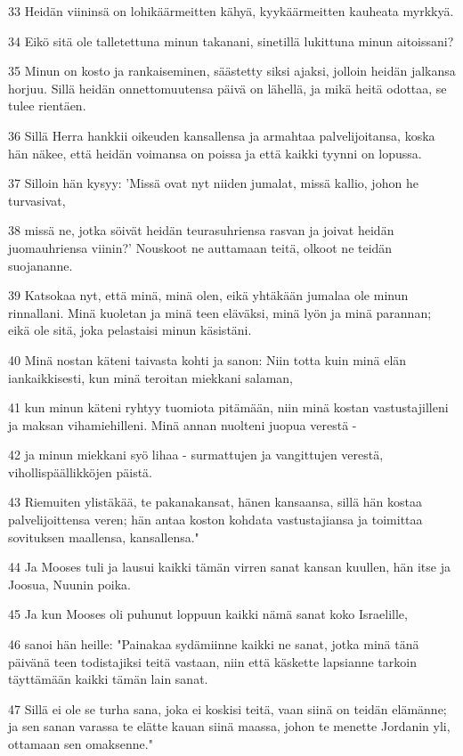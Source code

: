 \par 33 Heidän viininsä on lohikäärmeitten kähyä, kyykäärmeitten kauheata myrkkyä.
\par 34 Eikö sitä ole talletettuna minun takanani, sinetillä lukittuna minun aitoissani?
\par 35 Minun on kosto ja rankaiseminen, säästetty siksi ajaksi, jolloin heidän jalkansa horjuu. Sillä heidän onnettomuutensa päivä on lähellä, ja mikä heitä odottaa, se tulee rientäen.
\par 36 Sillä Herra hankkii oikeuden kansallensa ja armahtaa palvelijoitansa, koska hän näkee, että heidän voimansa on poissa ja että kaikki tyynni on lopussa.
\par 37 Silloin hän kysyy: 'Missä ovat nyt niiden jumalat, missä kallio, johon he turvasivat,
\par 38 missä ne, jotka söivät heidän teurasuhriensa rasvan ja joivat heidän juomauhriensa viinin?' Nouskoot ne auttamaan teitä, olkoot ne teidän suojananne.
\par 39 Katsokaa nyt, että minä, minä olen, eikä yhtäkään jumalaa ole minun rinnallani. Minä kuoletan ja minä teen eläväksi, minä lyön ja minä parannan; eikä ole sitä, joka pelastaisi minun käsistäni.
\par 40 Minä nostan käteni taivasta kohti ja sanon: Niin totta kuin minä elän iankaikkisesti, kun minä teroitan miekkani salaman,
\par 41 kun minun käteni ryhtyy tuomiota pitämään, niin minä kostan vastustajilleni ja maksan vihamiehilleni. Minä annan nuolteni juopua verestä -
\par 42 ja minun miekkani syö lihaa - surmattujen ja vangittujen verestä, vihollispäällikköjen päistä.
\par 43 Riemuiten ylistäkää, te pakanakansat, hänen kansaansa, sillä hän kostaa palvelijoittensa veren; hän antaa koston kohdata vastustajiansa ja toimittaa sovituksen maallensa, kansallensa."
\par 44 Ja Mooses tuli ja lausui kaikki tämän virren sanat kansan kuullen, hän itse ja Joosua, Nuunin poika.
\par 45 Ja kun Mooses oli puhunut loppuun kaikki nämä sanat koko Israelille,
\par 46 sanoi hän heille: "Painakaa sydämiinne kaikki ne sanat, jotka minä tänä päivänä teen todistajiksi teitä vastaan, niin että käskette lapsianne tarkoin täyttämään kaikki tämän lain sanat.
\par 47 Sillä ei ole se turha sana, joka ei koskisi teitä, vaan siinä on teidän elämänne; ja sen sanan varassa te elätte kauan siinä maassa, johon te menette Jordanin yli, ottamaan sen omaksenne."
